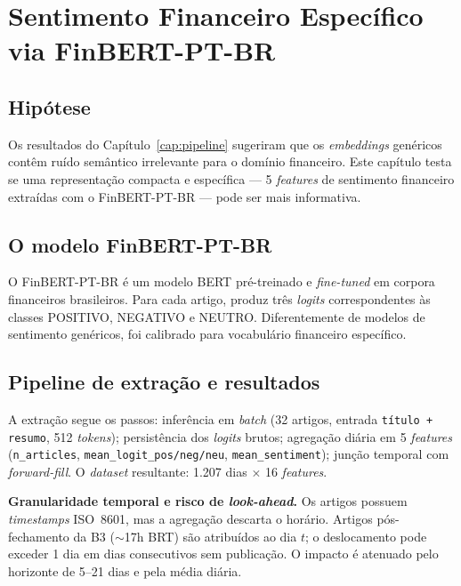 \documentclass[
    12pt,
    openright,
    oneside,
    a4paper,
    english,
    brazil
]{abntex2}
\begin{document}
\chapter{Sentimento Financeiro Específico via FinBERT-PT-BR}\label{cap:sentimento}

\section{Hipótese}

Os resultados do Capítulo~\ref{cap:pipeline} sugeriram que os \textit{embeddings} genéricos contêm ruído semântico irrelevante para o domínio financeiro. Este capítulo testa se uma representação compacta e específica --- 5 \textit{features} de sentimento financeiro extraídas com o FinBERT-PT-BR \cite{souza2023} --- pode ser mais informativa.

\section{O modelo FinBERT-PT-BR}

O FinBERT-PT-BR é um modelo BERT \cite{devlin2019} pré-treinado e \textit{fine-tuned} em corpora financeiros brasileiros. Para cada artigo, produz três \textit{logits} correspondentes às classes POSITIVO, NEGATIVO e NEUTRO. Diferentemente de modelos de sentimento genéricos, foi calibrado para vocabulário financeiro específico.

\section{Pipeline de extração e resultados}

A extração segue os passos: inferência em \textit{batch} (32 artigos, entrada \texttt{título + resumo}, 512 \textit{tokens}); persistência dos \textit{logits} brutos; agregação diária em 5 \textit{features} (\texttt{n\_articles}, \texttt{mean\_logit\_pos/neg/neu}, \texttt{mean\_sentiment}); junção temporal com \textit{forward-fill}. O \textit{dataset} resultante: 1.207 dias $\times$ 16 \textit{features}.

\textbf{Granularidade temporal e risco de \textit{look-ahead}.} Os artigos possuem \textit{timestamps} ISO~8601, mas a agregação descarta o horário. Artigos pós-fechamento da B3 ($\sim$17h BRT) são atribuídos ao dia $t$; o deslocamento pode exceder 1 dia em dias consecutivos sem publicação. O impacto é atenuado pelo horizonte de 5--21 dias e pela média diária.
\end{document}
